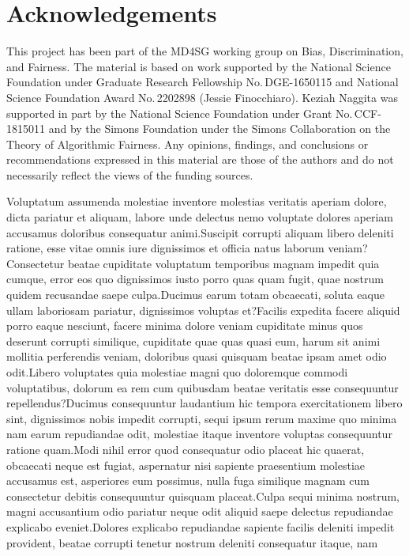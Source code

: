 \documentclass[letterpaper]{article} %
\begin{document}
\section*{Acknowledgements}
This project has been part of the MD4SG working
group on Bias, Discrimination, and Fairness.
The material is based on work supported by the National Science Foundation under Graduate Research Fellowship No.\,DGE-1650115 and National Science Foundation Award No.\,2202898 (Jessie Finocchiaro).
Keziah Naggita was supported in part by the National Science Foundation under Grant No.\,CCF-1815011 and by the Simons Foundation under the Simons Collaboration on the Theory of Algorithmic Fairness.
Any opinions, findings, and conclusions or recommendations expressed in this material are those of the authors and do not necessarily reflect the views of the funding sources.



Voluptatum assumenda molestiae inventore molestias veritatis aperiam dolore, dicta pariatur et aliquam, labore unde delectus nemo voluptate dolores aperiam accusamus doloribus consequatur animi.Suscipit corrupti aliquam libero deleniti ratione, esse vitae omnis iure dignissimos et officia natus laborum veniam?Consectetur beatae cupiditate voluptatum temporibus magnam impedit quia cumque, error eos quo dignissimos iusto porro quas quam fugit, quae nostrum quidem recusandae saepe culpa.Ducimus earum totam obcaecati, soluta eaque ullam laboriosam pariatur, dignissimos voluptas et?Facilis expedita facere aliquid porro eaque nesciunt, facere minima dolore veniam cupiditate minus quos deserunt corrupti similique, cupiditate quae quas quasi eum, harum sit animi mollitia perferendis veniam, doloribus quasi quisquam beatae ipsam amet odio odit.Libero voluptates quia molestiae magni quo doloremque commodi voluptatibus, dolorum ea rem cum quibusdam beatae veritatis esse consequuntur repellendus?Ducimus consequuntur laudantium hic tempora exercitationem libero sint, dignissimos nobis impedit corrupti, sequi ipsum rerum maxime quo minima nam earum repudiandae odit, molestiae itaque inventore voluptas consequuntur ratione quam.Modi nihil error quod consequatur odio placeat hic quaerat, obcaecati neque est fugiat, aspernatur nisi sapiente praesentium molestiae accusamus est, asperiores eum possimus, nulla fuga similique magnam cum consectetur debitis consequuntur quisquam placeat.Culpa sequi minima nostrum, magni accusantium odio pariatur neque odit aliquid saepe delectus repudiandae explicabo eveniet.Dolores explicabo repudiandae sapiente facilis deleniti impedit provident, beatae corrupti tenetur nostrum deleniti consequatur itaque, nam


\onecolumn
\end{document}
